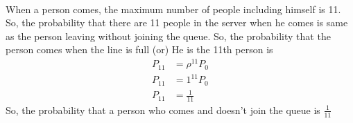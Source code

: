\documentclass[journal,12pt,twocolumn]{IEEEtran}
\begin{document}
 \\
When a person comes, the maximum number of people including himself is 11. So, the probability that there are 11 people in the server when he comes is same as the person leaving without joining the queue.
So, the probability that the person comes when the line is full (or) He is the 11th person is
\begin{align}
    P_{11}&=\rho^{11} P_{0}\\
    P_{11}&=1^{11} P_{0}\\
    P_{11}&= \frac{1}{11}
\end{align}
So, the probability that a person who comes and doesn't join the queue is $\frac{1}{11}$
\end{document}
